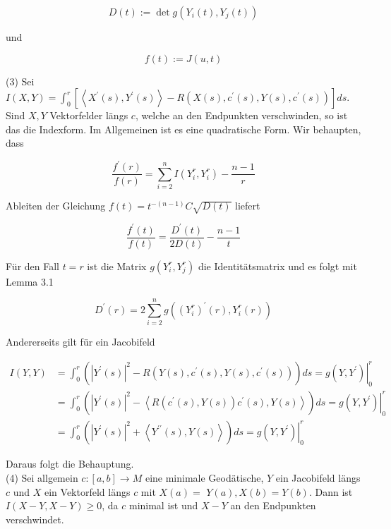 \documentclass[10pt, letterpaper]{article}
\begin{document}
$$
D(t):=\operatorname{det} g\left(Y_{i}(t), Y_{j}(t)\right)
$$

und

$$
f(t):=J(u, t)
$$

(3) Sei\\
$I(X, Y)=\int_{0}^{r}\left[\left\langle X^{\prime}(s), Y^{\prime}(s)\right\rangle-R\left(X(s), c^{\prime}(s), Y(s), c^{\prime}(s)\right)\right] d s$.\\
Sind $X, Y$ Vektorfelder längs $c$, welche an den Endpunkten verschwinden, so ist das die Indexform. Im Allgemeinen ist es eine quadratische Form. Wir behaupten, dass


\begin{equation*}
\frac{f^{\prime}(r)}{f(r)}=\sum_{i=2}^{n} I\left(Y_{i}^{r}, Y_{i}^{r}\right)-\frac{n-1}{r} \tag{12}
\end{equation*}


Ableiten der Gleichung $f(t)=t^{-(n-1)} C \sqrt{D(t)}$ liefert

$$
\frac{f^{\prime}(t)}{f(t)}=\frac{D^{\prime}(t)}{2 D(t)}-\frac{n-1}{t}
$$

Für den Fall $t=r$ ist die Matrix $g\left(Y_{i}^{r}, Y_{j}^{r}\right)$ die Identitätsmatrix und es folgt mit Lemma 3.1

$$
D^{\prime}(r)=2 \sum_{i=2}^{n} g\left(\left(Y_{i}^{r}\right)^{\prime}(r), Y_{i}^{r}(r)\right)
$$

Andererseits gilt für ein Jacobifeld

$$
\begin{aligned}
I(Y, Y) & =\int_{0}^{r}\left(\left|Y^{\prime}(s)\right|^{2}-R\left(Y(s), c^{\prime}(s), Y(s), c^{\prime}(s)\right)\right) d s=\left.g\left(Y, Y^{\prime}\right)\right|_{0} ^{r} \\
& =\int_{0}^{r}\left(\left|Y^{\prime}(s)\right|^{2}-\left\langle R\left(c^{\prime}(s), Y(s)\right) c^{\prime}(s), Y(s)\right\rangle\right) d s=\left.g\left(Y, Y^{\prime}\right)\right|_{0} ^{r} \\
& =\int_{0}^{r}\left(\left|Y^{\prime}(s)\right|^{2}+\left\langle Y^{\prime \prime}(s), Y(s)\right\rangle\right) d s=\left.g\left(Y, Y^{\prime}\right)\right|_{0} ^{r}
\end{aligned}
$$

Daraus folgt die Behauptung.\\
(4) Sei allgemein $c:[a, b] \rightarrow M$ eine minimale Geodätische, $Y$ ein Jacobifeld längs $c$ und $X$ ein Vektorfeld längs $c$ mit $X(a)=$ $Y(a), X(b)=Y(b)$. Dann ist $I(X-Y, X-Y) \geq 0$, da $c$ minimal ist und $X-Y$ an den Endpunkten verschwindet.
\end{document}
